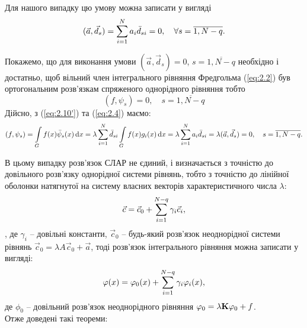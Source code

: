 Для нашого випадку цю умову можна записати у вигляді
\begin{equation}
	\label{eq:2.11}
	(\vec a, \vec d_s) = \Sum_{i = 1}^N a_i \bar d_{si} = 0, \quad \forall s = \overline{1, N - q}.
\end{equation}

Покажемо, що для виконання умови $(\vec a, \vec d_s) = 0$, $s = \overline{1, N - q}$ необхідно і достатньо, щоб вільний член інтегрального рівняння Фредгольма (\ref{eq:2.2}) був ортогональним розв'язкам спряженого однорідного рівняння тобто 
\begin{equation}
	\label{eq:2.12}
	(f, \psi_s) = 0, \quad s = \overline{1, N - q}
\end{equation}
Дійсно, з (\ref{eq:2.10'}) та (\ref{eq:2.4}) маємо:
\[ (f, \psi_s) = \Int_G f(x) \bar \psi_s (x) \diff x = \lambda \Sum_{i = 1}^N \bar d_{si} \Int_G f(x) g_i(x) \diff x = \lambda \Sum_{i = 1}^N a_i \bar d_{si} = \lambda (\vec a, \vec d_s) = 0, \quad s = \overline{1, N - q}. \]

В цьому випадку розв'язок СЛАР не єдиний, і визначається з точністю до довільного розв'язку однорідної системи рівнянь, тобто з точністю до лінійної оболонки натягнутої на систему власних векторів характеристичного числа $\lambda$:
\begin{equation}
	\label{eq:2.13}
	\vec c = \vec c_0 + \Sum_{i = 1}^{N - q} \gamma_i \vec c_i,
\end{equation},
де $\gamma_i$ -- довільні константи, $\vec c_0$ -- будь-який розв'язок неоднорідної системи рівнянь $\vec c_0 = \lambda A \vec c_0 + \vec a$, тоді розв'язок інтегрального рівняння можна записати у вигляді:
\begin{equation}
	\label{eq:2.14}
	\phi(x) = \phi_0(x) + \Sum_{i = 1}^{N - q} \gamma_i \phi_i(x),
\end{equation}
де $\phi_0$ -- довільний розв'язок неоднорідного рівняння $\phi_0 = \lambda \bf{K} \phi_0 + f$. \\

Отже доведені такі теореми:

